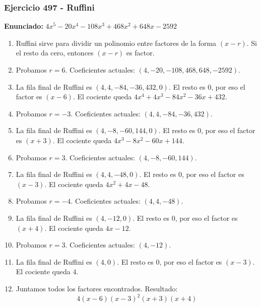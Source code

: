 \documentclass[11pt,a4paper]{article}
\begin{document}
\subsubsection*{Ejercicio 497 - Ruffini}
\textbf{Enunciado:} $ 4 x^{5} - 20 x^{4} - 108 x^{3} + 468 x^{2} + 648 x - 2592 $\par
\begin{enumerate}[leftmargin=2em]
\item Ruffini sirve para dividir un polinomio entre factores de la forma \((x-r)\). Si el resto da cero, entonces \((x-r)\) es factor.
\item Probamos \(r=6\). Coeficientes actuales: \((4, -20, -108, 468, 648, -2592)\).
\item La fila final de Ruffini es \((4, 4, -84, -36, 432, 0)\). El resto es \(0\), por eso el factor es \((x-6)\). El cociente queda \(4 x^{4} + 4 x^{3} - 84 x^{2} - 36 x + 432\).
\item Probamos \(r=-3\). Coeficientes actuales: \((4, 4, -84, -36, 432)\).
\item La fila final de Ruffini es \((4, -8, -60, 144, 0)\). El resto es \(0\), por eso el factor es \((x+3)\). El cociente queda \(4 x^{3} - 8 x^{2} - 60 x + 144\).
\item Probamos \(r=3\). Coeficientes actuales: \((4, -8, -60, 144)\).
\item La fila final de Ruffini es \((4, 4, -48, 0)\). El resto es \(0\), por eso el factor es \((x-3)\). El cociente queda \(4 x^{2} + 4 x - 48\).
\item Probamos \(r=-4\). Coeficientes actuales: \((4, 4, -48)\).
\item La fila final de Ruffini es \((4, -12, 0)\). El resto es \(0\), por eso el factor es \((x+4)\). El cociente queda \(4 x - 12\).
\item Probamos \(r=3\). Coeficientes actuales: \((4, -12)\).
\item La fila final de Ruffini es \((4, 0)\). El resto es \(0\), por eso el factor es \((x-3)\). El cociente queda \(4\).
\item Juntamos todos los factores encontrados. Resultado: \[\boxed{4 \left(x - 6\right) \left(x - 3\right)^{2} \left(x + 3\right) \left(x + 4\right)}\]
\end{enumerate}

\vspace{0.2cm}
\end{document}
